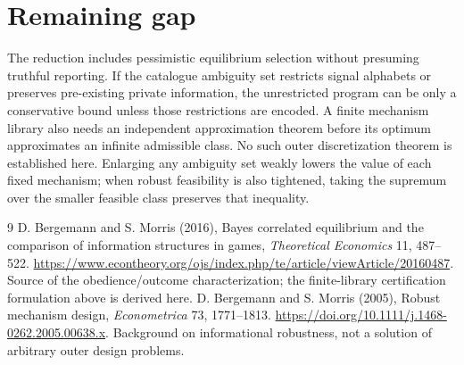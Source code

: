 \documentclass[11pt]{article}
\theoremstyle{definition}
\theoremstyle{remark}
\begin{document}
\section{Remaining gap}
The reduction includes pessimistic equilibrium selection without presuming truthful reporting. If the catalogue ambiguity set restricts signal alphabets or preserves pre-existing private information, the unrestricted program can be only a conservative bound unless those restrictions are encoded. A finite mechanism library also needs an independent approximation theorem before its optimum approximates an infinite admissible class. No such outer discretization theorem is established here. Enlarging any ambiguity set weakly lowers the value of each fixed mechanism; when robust feasibility is also tightened, taking the supremum over the smaller feasible class preserves that inequality.

\begin{thebibliography}{9}
 D. Bergemann and S. Morris (2016), Bayes correlated equilibrium and the comparison of information structures in games, \emph{Theoretical Economics} 11, 487--522. \url{https://www.econtheory.org/ojs/index.php/te/article/viewArticle/20160487}. Source of the obedience/outcome characterization; the finite-library certification formulation above is derived here.
 D. Bergemann and S. Morris (2005), Robust mechanism design, \emph{Econometrica} 73, 1771--1813. \url{https://doi.org/10.1111/j.1468-0262.2005.00638.x}. Background on informational robustness, not a solution of arbitrary outer design problems.
\end{thebibliography}
\end{document}
